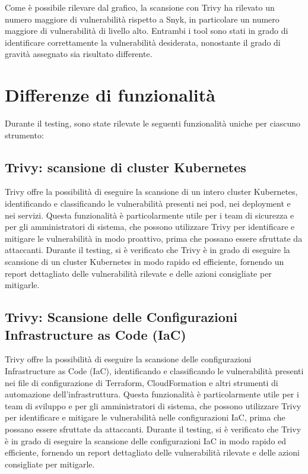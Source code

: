 Come è possibile rilevare dal grafico, la scansione con Trivy ha rilevato un numero maggiore di vulnerabilità rispetto a Snyk, in particolare un numero maggiore di vulnerabilità di livello alto.
Entrambi i tool sono stati in grado di identificare correttamente la vulnerabilità desiderata, nonostante il grado di gravità assegnato sia risultato differente.



\section{Differenze di funzionalità}
Durante il testing, sono state rilevate le seguenti funzionalità uniche per ciascuno strumento:
\subsection{Trivy: scansione di cluster Kubernetes}
Trivy offre la possibilità di eseguire la scansione di un intero cluster Kubernetes, identificando e classificando le vulnerabilità presenti nei pod, nei deployment e nei servizi. Questa funzionalità è particolarmente utile per i team di sicurezza e per gli amministratori di sistema, che possono utilizzare Trivy per identificare e mitigare le vulnerabilità in modo proattivo, prima che possano essere sfruttate da attaccanti. Durante il testing, si è verificato che Trivy è in grado di eseguire la scansione di un cluster Kubernetes in modo rapido ed efficiente, fornendo un report dettagliato delle vulnerabilità rilevate e delle azioni consigliate per mitigarle.
\subsection{Trivy: Scansione delle Configurazioni Infrastructure as Code (IaC)}
Trivy offre la possibilità di eseguire la scansione delle configurazioni Infrastructure as Code (IaC), identificando e classificando le vulnerabilità presenti nei file di configurazione di Terraform, CloudFormation e altri strumenti di automazione dell'infrastruttura. Questa funzionalità è particolarmente utile per i team di sviluppo e per gli amministratori di sistema, che possono utilizzare Trivy per identificare e mitigare le vulnerabilità nelle configurazioni IaC, prima che possano essere sfruttate da attaccanti. Durante il testing, si è verificato che Trivy è in grado di eseguire la scansione delle configurazioni IaC in modo rapido ed efficiente, fornendo un report dettagliato delle vulnerabilità rilevate e delle azioni consigliate per mitigarle.

